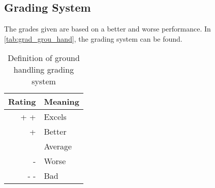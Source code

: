 \begin{comment}
\begin{table}[]
    \centering
    \caption{Ground Handling Sub Trade-off}
    \label{tab:summ_grou_hand}
    \begin{tabular}{r|>{\centering}p{2.5cm}:>{\centering}p{0.5cm}:>{\centering}p{1.25cm}:>{\centering}p{2cm}:>{\centering}p{2.5cm}|C}
    \textbf{Concept \rotatebox{90}{\hspace{0.5cm}Criterion}}            & 
    \rotatebox{90}{\textbf{Assembly}}                                   &
    \rotatebox{90}{\textbf{Dimensions}}                                 & 
    \rotatebox{90}{\textbf{Mass}}                                       & 
    \rotatebox{90}{\multicolumn{1}{p{2cm}}{\raggedright \textbf{Payload mounting}}}  & 
    \rotatebox{90}{\textbf{Maintenance}}                                &
    \rotatebox{90}{\textbf{Outcome}}
    \\ \midrule
    Tailsitter      &  +    & - -   &  +     &  + +  &   -   & 60\% 
    \\\hdashline
    Tandem          & - -   & + +   &  -     &   0   &   0   & 38\% 
    \\\hdashline
    Prandtl Box     &  0    & + +   & + +    &   -   &   +   & 54\% 
    \\\hdashline
    Tiltrotor       &  -    & -     &  -     &  + +  &  0    & 51\% 
    \\\hdashline
    Winged Quad.    &  +    & 0     & + +    &  + +  &  +    & 82\% 
    \\ \midrule\midrule
    Weight          & 27    & 10     & 15   & 21    & 27    &  
    \end{tabular}
\end{table}
\end{comment}

\subsection{Grading System}

The grades given are based on a better and worse performance. In \autoref{tab:grad_grou_hand}, the grading system can be found.
\begin{table}[h]
    \centering
    \caption{Definition of ground handling grading system}
    \label{tab:grad_grou_hand}
    \begin{tabular}{r l}
    \toprule
     Rating    & Meaning 
     \\ \midrule
     + + & Excels 
    \\ \hdashline
    + & Better
    \\ \hdashline
    0 & Average
    \\ \hdashline
    - & Worse
    \\ \hdashline
    - - & Bad
    \\ \bottomrule
    \end{tabular}
\end{table}



